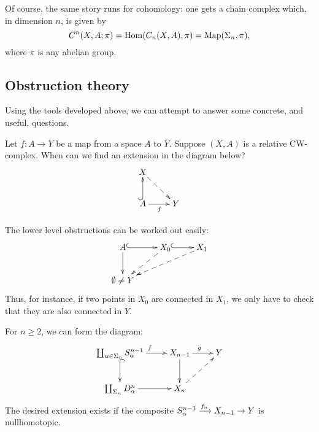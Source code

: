 Of course, the same story runs for cohomology: one gets a chain complex which, in dimension $n$, is given by
$$C^n(X,A;\pi) = \operatorname{Hom}(C_n(X,A),\pi) = \operatorname{Map}(\Sigma_n,\pi),$$
where $\pi$ is any abelian group.
\subsection{Obstruction theory}
Using the tools developed above, we can attempt to answer some concrete, and useful, questions.
\begin{question}
    Let $f:A \to Y$ be a map from a space $A$ to $Y$.
    Suppose $(X,A)$ is a relative CW-complex.
    When can we find an extension in the diagram below?
    \begin{equation*}
	\xymatrix{
	    X\ar@{-->}[dr] & \\
	    A\ar@{^(->}[u]\ar[r]_f & Y
	    }
    \end{equation*}
\end{question}
The lower level obstructions can be worked out easily:
\begin{equation*}
    \xymatrix{
	A\ar[d]\ar@{^(->}[r] & X_0\ar@{-->}[dl]\ar@{^(->}[r] & X_1\ar@{-->}[dll]\\
	\emptyset\neq Y & &
    }
\end{equation*}
Thus, for instance, if two points in $X_0$ are connected in $X_1$, we only have to check that they are also connected in $Y$.

For $n\geq 2$, we can form the diagram:
\begin{equation*}
    \xymatrix{
	\coprod_{\alpha\in\Sigma_n}S^{n-1}_\alpha\ar[r]^f\ar@{^(->}[d] & X_{n-1}\ar[r]^g\ar[d] & Y\\
	\coprod_{\Sigma_n}D^n_\alpha\ar[r] & X_n\ar@{-->}[ur] & 
    }
\end{equation*}
The desired extension exists if the composite $S^{n-1}_\alpha\xrightarrow{{f_\alpha}} X_{n-1}\to Y$ is nullhomotopic.

